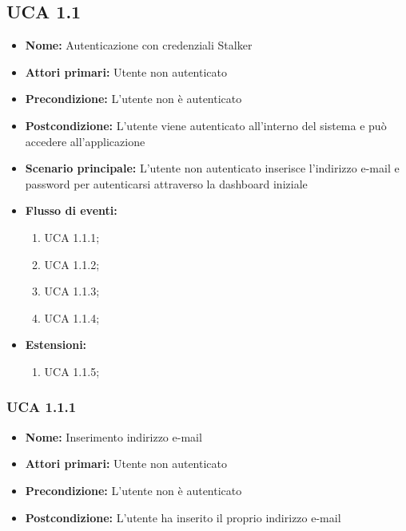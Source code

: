 \subsection{UCA 1.1}%
\begin{itemize}
\item \textbf{Nome:} Autenticazione con credenziali Stalker
\item \textbf{Attori primari:} Utente non autenticato
\item \textbf{Precondizione:} L’utente non è autenticato
\item \textbf{Postcondizione:} L’utente viene autenticato all’interno del sistema e può accedere all'applicazione
\item \textbf{Scenario principale:} L’utente non autenticato inserisce l’indirizzo e-mail e password per autenticarsi attraverso la dashboard iniziale%
\item \textbf{Flusso di eventi:} %
  \begin{enumerate}
        \item UCA 1.1.1;
        \item UCA 1.1.2;
        \item UCA 1.1.3;
        \item UCA 1.1.4;
    \end{enumerate}
\item \textbf{Estensioni:}
	\begin{enumerate}
		\item UCA 1.1.5;
	\end{enumerate}
\end{itemize}

\subsubsection{UCA 1.1.1}%
\begin{itemize}
\item \textbf{Nome:} Inserimento indirizzo e-mail
\item \textbf{Attori primari:}  Utente non autenticato
\item \textbf{Precondizione:}  L’utente non è autenticato
\item \textbf{Postcondizione:}  L’utente ha inserito il proprio indirizzo e-mail
\end{itemize}

